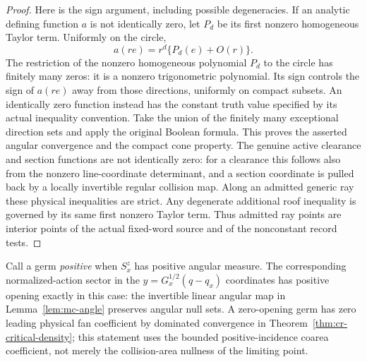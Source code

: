 \begin{proof}
Here is the sign argument, including possible degeneracies.  If
an analytic defining function $a$ is not identically zero, let
$P_d$ be its first nonzero homogeneous Taylor term.  Uniformly on
the circle,
\[
                  a(r e)=r^d\{P_d(e)+O(r)\}.
\]
The restriction of the nonzero homogeneous polynomial $P_d$ to the
circle has finitely many zeros: it is a nonzero trigonometric
polynomial.  Its sign controls the sign of $a(r e)$ away from
those directions, uniformly on compact subsets.  An identically
zero function instead has the constant truth value specified by
its actual inequality convention.  Take the union of the finitely
many exceptional direction sets and apply the original Boolean
formula.  This proves the asserted angular convergence and the
compact cone property.  The genuine active clearance and section
functions are not identically zero: for a clearance this follows
also from the nonzero line-coordinate determinant, and a section
coordinate is pulled back by a locally invertible regular collision
map.  Along an admitted generic ray these physical inequalities
are strict.  Any degenerate additional roof inequality is governed
by its same first nonzero Taylor term.  Thus admitted ray points
are interior points of the actual fixed-word source and of the
nonconstant record tests.
\end{proof}

Call a germ \emph{positive} when $S_x^z$ has positive angular
measure.  The corresponding normalized-action sector in the
$y=G_x^{1/2}(q-q_x)$ coordinates has positive opening exactly in
this case: the invertible linear angular map in
Lemma~\ref{lem:mc-angle} preserves angular null sets.  A zero-opening
germ has zero leading physical fan coefficient by dominated
convergence in Theorem~\ref{thm:cr-critical-density}; this statement
uses the bounded positive-incidence coarea coefficient, not merely
the collision-area nullness of the limiting point.

